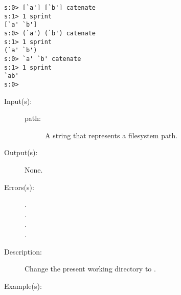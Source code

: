 \begin{description}
\begin{description}
\begin{verbatim}
s:0> [`a'] [`b'] catenate
s:1> 1 sprint
[`a' `b']
s:0> (`a') (`b') catenate
s:1> 1 sprint
(`a' `b')
s:0> `a' `b' catenate
s:1> 1 sprint
`ab'
s:0>
		\end{verbatim}
	\end{description}
\label{systemdict:cd}
\item[{\stilop{path}{cd}{--}}: ]
	\begin{description}\item[]
	\item[Input(s): ]
		\begin{description}\item[]
		\item[path: ]
			A string that represents a filesystem path.
		\end{description}
	\item[Output(s): ] None.
	\item[Errors(s): ]
		\begin{description}\item[]
		\item[.]
		\item[.]
		\item[.]
		\item[.]
		\end{description}
	\item[Description: ]
		Change the present working directory to .
	\item[Example(s): ]\begin{verbatim}


\end{verbatim}
\end{description}
\end{description}
